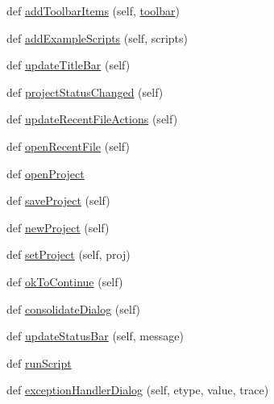 \begin{DoxyCompactItemize}
\item 
def \hyperlink{classsoftware_1_1chipwhisperer_1_1common_1_1ui_1_1CWMainGUI_1_1CWMainGUI_a49f19ceb65f0cdb6dc71d27e6ff8f287}{add\+Toolbar\+Items} (self, \hyperlink{classsoftware_1_1chipwhisperer_1_1common_1_1ui_1_1CWMainGUI_1_1CWMainGUI_adf592b27a819600e43d6200cda9a07bc}{toolbar})
\item 
def \hyperlink{classsoftware_1_1chipwhisperer_1_1common_1_1ui_1_1CWMainGUI_1_1CWMainGUI_a27795502bdaee3c8868b98f148cdfc13}{add\+Example\+Scripts} (self, scripts)
\item 
def \hyperlink{classsoftware_1_1chipwhisperer_1_1common_1_1ui_1_1CWMainGUI_1_1CWMainGUI_a48daee3a3235511d1f3c86ab7a247912}{update\+Title\+Bar} (self)
\item 
def \hyperlink{classsoftware_1_1chipwhisperer_1_1common_1_1ui_1_1CWMainGUI_1_1CWMainGUI_a9881317cf4198d05fc523befbe518360}{project\+Status\+Changed} (self)
\item 
def \hyperlink{classsoftware_1_1chipwhisperer_1_1common_1_1ui_1_1CWMainGUI_1_1CWMainGUI_a94bded999e3ce5cc3292429a656626e9}{update\+Recent\+File\+Actions} (self)
\item 
def \hyperlink{classsoftware_1_1chipwhisperer_1_1common_1_1ui_1_1CWMainGUI_1_1CWMainGUI_a5cbbf9b90beee7aff5f94915358e999d}{open\+Recent\+File} (self)
\item 
def \hyperlink{classsoftware_1_1chipwhisperer_1_1common_1_1ui_1_1CWMainGUI_1_1CWMainGUI_acdd5a4b385bb16859a29231c5874ffda}{open\+Project}
\item 
def \hyperlink{classsoftware_1_1chipwhisperer_1_1common_1_1ui_1_1CWMainGUI_1_1CWMainGUI_a47eb2b3ed6ff6acb085f8a06c0d2cf7f}{save\+Project} (self)
\item 
def \hyperlink{classsoftware_1_1chipwhisperer_1_1common_1_1ui_1_1CWMainGUI_1_1CWMainGUI_ab7eef594c9bf4c38008a1b60aacd1771}{new\+Project} (self)
\item 
def \hyperlink{classsoftware_1_1chipwhisperer_1_1common_1_1ui_1_1CWMainGUI_1_1CWMainGUI_ad5b9f553f41935d275fc7e8341faf6c1}{set\+Project} (self, proj)
\item 
def \hyperlink{classsoftware_1_1chipwhisperer_1_1common_1_1ui_1_1CWMainGUI_1_1CWMainGUI_a4f9c0373b4c7217951813abef3a0b855}{ok\+To\+Continue} (self)
\item 
def \hyperlink{classsoftware_1_1chipwhisperer_1_1common_1_1ui_1_1CWMainGUI_1_1CWMainGUI_a62689111f7338e5a97db0db1b78c1257}{consolidate\+Dialog} (self)
\item 
def \hyperlink{classsoftware_1_1chipwhisperer_1_1common_1_1ui_1_1CWMainGUI_1_1CWMainGUI_a89f6d6e44a900b3980df8b5fd7d1c638}{update\+Status\+Bar} (self, message)
\item 
def \hyperlink{classsoftware_1_1chipwhisperer_1_1common_1_1ui_1_1CWMainGUI_1_1CWMainGUI_a2b43ef40fe950de997c6549d4e7e5d0a}{run\+Script}
\item 
def \hyperlink{classsoftware_1_1chipwhisperer_1_1common_1_1ui_1_1CWMainGUI_1_1CWMainGUI_ad4b8827f89baceb7b469474d6e8c9d01}{exception\+Handler\+Dialog} (self, etype, value, trace)
\end{DoxyCompactItemize}
